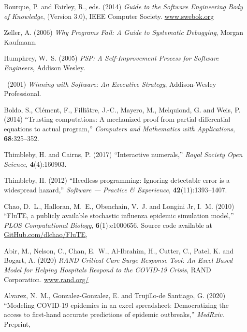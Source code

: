 \documentclass[10pt,a4paper]{article}
\begin{document}
{\begin{thebibliography}{10}
Bourque, P. and Fairley, R., eds. (2014) {\em Guide to the Software Engineering
  Body of Knowledge}, (Version 3.0), IEEE Computer Society.
\newblock \url{www.swebok.org}

Zeller, A. (2006) {\em Why Programs Fail: A Guide to Systematic Debugging},
  Morgan Kaufmann.

Humphrey, W.~S. (2005) {\em PSP: A Self-Improvement Process for Software
  Engineers}, Addison Wesley.

\leavevmode\vrule height 2pt depth -1.6pt width 23pt\  (2001) {\em Winning with
  Software: An Executive Strategy}, Addison-Wesley Professional.

Boldo, S., Cl{\'{e}}ment, F., Filli{\^{a}}tre, J.-C., Mayero, M., Melquiond, G.
  and Weis, P. (2014) ``Trusting computations: {A} mechanized proof from
  partial differential equations to actual program,'' {\em Computers and
  Mathematics with Applications}, \textbf{68}:325--352.
\newblock {}

Thimbleby, H. and Cairns, P. (2017) ``Interactive numerals,'' {\em Royal
  Society Open Science}, \textbf{4}(4):160903.
\newblock {}

Thimbleby, H. (2012) ``Heedless programming: Ignoring detectable error is a
  widespread hazard,'' {\em Software --- Practice {\&} Experience},
  \textbf{42}(11):1393--1407.
\newblock {}

Chao, D.~L., Halloran, M.~E., Obenchain, V.~J. and {Longini Jr}, I.~M. (2010)
  ``{FluTE}, a publicly available stochastic influenza epidemic simulation
  model,'' {\em PLOS Computational Biology}, \textbf{6}(1):e1000656.
\newblock Source code available at \url{GitHub.com/dlchao/FluTE},

Abir, M., Nelson, C., Chan, E.~W., Al-Ibrahim, H., Cutter, C., Patel, K. and
  Bogart, A. (2020) {\em {RAND} Critical Care Surge Response Tool: {An}
  Excel-Based Model for Helping Hospitals Respond to the {COVID-19} Crisis},
  RAND Corporation.
\newblock
  \url{www.rand.org/}

Alvarez, N.~M., Gonzalez-Gonzalez, E. and Trujillo-de Santiago, G. (2020)
  ``Modeling {COVID-19} epidemics in an excel spreadsheet: {Democratizing} the
  access to first-hand accurate predictions of epidemic outbreaks,'' {\em
  MedRxiv}.
\newblock Preprint, 


\end{thebibliography}}
\end{document}
